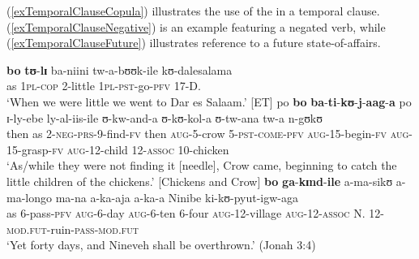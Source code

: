 \largerpage
(\ref{exTemporalClauseCopula}) illustrates the use of the  in a temporal clause. (\ref{exTemporalClauseNegative}) is an example featuring a negated verb, while (\ref{exTemporalClauseFuture}) illustrates reference to a future state-of-affairs.
\begin{exe}
\ex  \label{exTemporalClauseCopula} \gll \textbf{bo} \textbf{tʊ}-\textbf{lɪ} ba-niini tw-a-bʊʊk-ile kʊ-dalesalama\\
as \textsc{1pl}-\textsc{cop} 2-little \textsc{1pl}-\textsc{pst}-go-\textsc{pfv} 17-D.\\
\glt \lq When we were little we went to Dar es Salaam.'  [ET]
\ex \label{exTemporalClauseNegative}
\gll po \textbf{bo} \textbf{ba}-\textbf{ti}-\textbf{kʊ}-\textbf{j}-\textbf{aag}-\textbf{a} po ɪ-ly-ebe ly-al-iis-ile ʊ-kw-and-a ʊ-kʊ-kol-a ʊ-tw-ana tw-a n-gʊkʊ\\
then as 2-\textsc{neg}-\textsc{prs}-9-find-\textsc{fv} then \textsc{aug}-5-crow 5-\textsc{pst}-\textsc{come}-\textsc{pfv} \textsc{aug}-15-begin-\textsc{fv} \textsc{aug}-15-grasp-\textsc{fv} \textsc{aug}-12-child 12-\textsc{assoc} 10-chicken\\
\glt \lq As/while they were not finding it [needle], Crow came, beginning to catch the little children of the chickens.' [Chickens and Crow]
\ex \label{exTemporalClauseFuture} \gll \textbf{bo} \textbf{ga}-\textbf{kɪnd}-\textbf{ile} a-ma-sikʊ a-ma-longo ma-na a-ka-aja a-ka-a Ninibe ki-kʊ-pyut-igw-aga\\
as 6-pass-\textsc{pfv} \textsc{aug}-6-day \textsc{aug}-6-ten 6-four \textsc{aug}-12-village \textsc{aug}-12-\textsc{assoc} N. 12-\textsc{mod.fut}-ruin-\textsc{pass}-\textsc{mod.fut}\\
\glt \lq Yet forty days, and Nineveh shall be overthrown.' (Jonah 3:4)
\end{exe}

